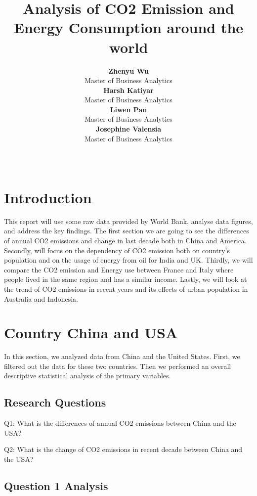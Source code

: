 \documentclass[11pt,a4paper,]{article}
\title{Analysis of CO2 Emission and Energy Consumption around the world}
\author{\sf\Large\textbf{ Zhenyu Wu}\\ {\sf\large Master of Business Analytics\\[0.5cm]} \sf\Large\textbf{ Harsh Katiyar}\\ {\sf\large Master of Business Analytics\\[0.5cm]} \sf\Large\textbf{ Liwen Pan}\\ {\sf\large Master of Business Analytics\\[0.5cm]} \sf\Large\textbf{ Josephine Valensia}\\ {\sf\large Master of Business Analytics\\[0.5cm]}}
\date{\sf\Date~\Month~\Year}
\makeatletter
\def\titlepage{\front{\expandafter{\@title}}{\@author}{\@organization}}
\makeatother
\begin{document}
\titlepage

\section*{Introduction}

This report will use some raw data provided by World Bank, analyse data figures, and address the key findings. The first section we are going to see the differences of annual CO2 emissions and change in last decade both in China and America. Secondly, will focus on the dependency of CO2 emission both on country's population and on the usage of energy from oil for India and UK. Thirdly, we will compare the CO2 emission and Energy use between France and Italy where people lived in the same region and has a similar income. Lastly, we will look at the trend of CO2 emissions in recent years and its effects of urban population in Australia and Indonesia.

\section*{Country China and USA}

In this section, we analyzed data from China and the United States. First, we filtered out the data for these two countries. Then we performed an overall descriptive statistical analysis of the primary variables.

\hypertarget{research-questions}{%
\subsection{Research Questions}\label{research-questions}}

Q1: What is the differences of annual CO2 emissions between China and the USA?

Q2: What is the change of CO2 emissions in recent decade between China and the USA?

\hypertarget{question-1-analysis}{%
\subsection{Question 1 Analysis}\label{question-1-analysis}}
\end{document}
